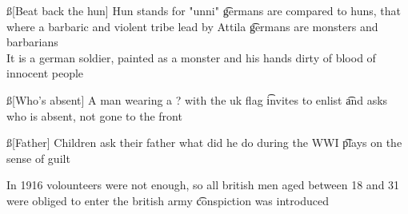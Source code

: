 \documentclass[12pt]{article}
\begin{document}
\ss[Beat back the hun]
Hun stands for "unni" \t germans are compared to huns, that where a barbaric and violent tribe lead by Attila \t germans are monsters and barbarians \\
It is a german soldier, painted as a monster and his hands dirty of blood of innocent people

\ss[Who's absent]
A man wearing a ? with the uk flag \t invites to enlist \t and asks who is absent, not gone to the front

\ss[Father]
Children ask their father what did he do during the WWI \t plays on the sense of guilt

In 1916 volounteers were not enough, so all british men aged between 18 and 31 were obliged to enter the british army \t conspiction was introduced
\end{document}
